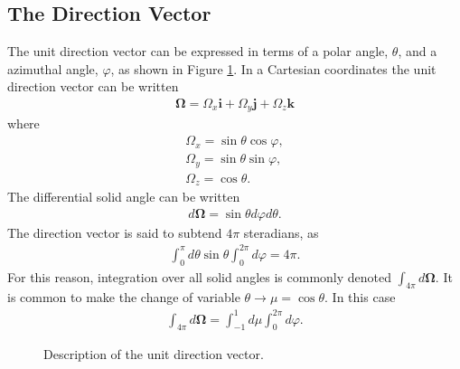 \documentclass[11pt]{article}
\renewcommand\vec{\mathbf}
\begin{document}
\subsection{The Direction Vector}
\label{sec:orgheadline68}
The unit direction vector can be expressed in terms of a polar angle, \(\theta\), and a azimuthal angle, \(\varphi\), as shown in Figure \ref{fig::unitDirection}.  In a Cartesian coordinates the unit direction vector can be written
\begin{align}
  \vec{\Omega} = \Omega_x \vec{i} + \Omega_y \vec{j} + \Omega_z \vec{k}
\end{align} 
where
\begin{subequations}
\begin{align}
  \Omega_x = \sin\theta \cos\varphi, \\
  \Omega_y = \sin\theta \sin\varphi, \\
  \Omega_z = \cos\theta.
\end{align}
\end{subequations}
The differential solid angle can be written
\begin{align}
  d\vec{\Omega} = \sin\theta d\varphi d\theta.
\end{align}
The direction vector is said to subtend \(4\pi\) steradians, as
\begin{align}
  \int_0^\pi d\theta \sin\theta \int_0^{2\pi} d\varphi = 4\pi.
\end{align}
For this reason, integration over all solid angles is commonly denoted \(\int_{4\pi} d\vec{\Omega}\).
It is common to make the change of variable \(\theta \rightarrow \mu = \cos\theta\).  In this case
\begin{align}
  \int_{4\pi} d\vec{\Omega} = \int_{-1}^1 d\mu \int_0^{2\pi} d\varphi.
\end{align}

\begin{figure}
\centering
{}
\caption{Description of the unit direction vector.}
\label{fig::unitDirection}
\end{figure}
\end{document}

